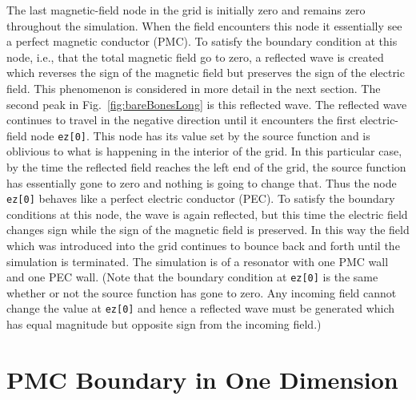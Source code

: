The last magnetic-field node in the grid is initially zero and remains
zero throughout the simulation.  When the field encounters this node
it essentially see a perfect magnetic conductor (PMC).  To satisfy the
boundary condition at this node, i.e., that the total magnetic field
go to zero, a reflected wave is created which reverses the sign of the
magnetic field but preserves the sign of the electric field.  This
phenomenon is considered in more detail in the next section.  The
second peak in Fig.\ \ref{fig:bareBonesLong} is this reflected wave.
The reflected wave continues to travel in the negative direction until
it encounters the first electric-field node {\tt ez[0]}.  This node
has its value set by the source function and is oblivious to what is
happening in the interior of the grid.  In this particular case, by
the time the reflected field reaches the left end of the grid, the
source function has essentially gone to zero and nothing is going to
change that.  Thus the node {\tt ez[0]} behaves like a perfect
electric conductor (PEC).  To satisfy the boundary conditions at this
node, the wave is again reflected, but this time the electric field
changes sign while the sign of the magnetic field is preserved.  In
this way the field which was introduced into the grid continues to
bounce back and forth until the simulation is terminated.  The
simulation is of a resonator with one PMC wall and one PEC wall.
(Note that the boundary condition at {\tt ez[0]} is the same whether
or not the source function has gone to zero.  Any incoming field
cannot change the value at {\tt ez[0]} and hence a reflected wave must
be generated which has equal magnitude but opposite sign from the
incoming field.)

\section{PMC Boundary in One Dimension \label{sec:pmcBoundary}} 


